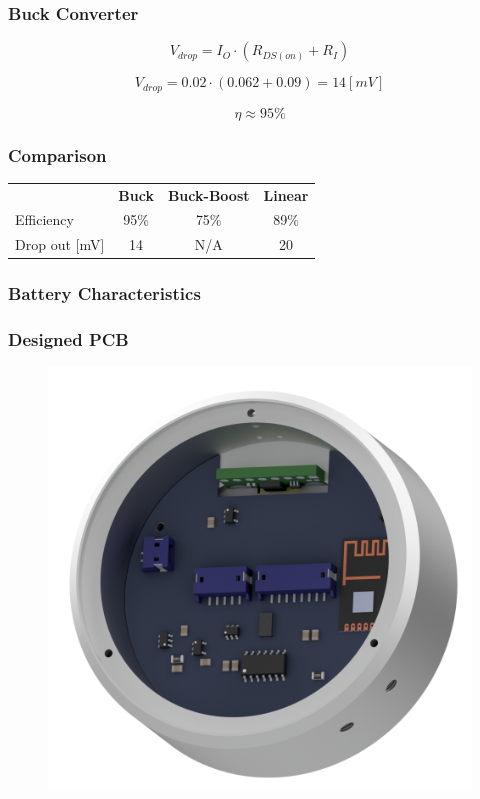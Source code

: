 \documentclass[mathserif]{beamer}
\begin{document}
\begin{frame}[c]\frametitle{Buck Converter}
	\begin{equation}
		V_{drop} = I_{O} \cdot (R_{DS(on)}+R_I)
		\label{eq:drop_v_tps62}
	\end{equation}

	\begin{equation}
		V_{drop} = 0.02 \cdot (0.062+0.09) = 14 [mV]
		\label{eq:drop_v_tps62_2}
	\end{equation}

	\begin{equation}
		\eta \approx 95\%
	\end{equation}
\end{frame}

\begin{frame}[c]\frametitle{Comparison}
	\begin{table}[h]
		\begin{tabular}{l|c|c|c}
			  ~				& \textbf{Buck} 	& \textbf{Buck-Boost}& \textbf{Linear}\tabularnewline 
			 Efficiency  	& 95\% 	& 75\%		& 89\%	\\
			 Drop out [mV]	& 14  	& N/A		& 20	\\
		\end{tabular}
	\end{table}
\end{frame}

\begin{frame}[t]\frametitle{Battery Characteristics}
    \begin{figure}[h]
		\centering
		
	\end{figure}
\end{frame}

\begin{frame}[c]\frametitle{Designed PCB}
	\begin{figure}
	\centering
	\includegraphics[width=.7\linewidth]{graphics/joint_assembly}
	\end{figure}
\end{frame}
\end{document}
